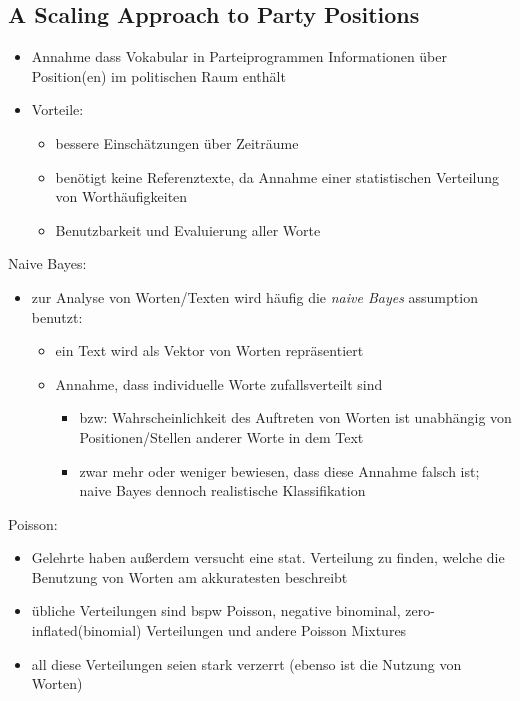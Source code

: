\documentclass[11pt]{article}
\begin{document}
\subsection{A Scaling Approach to Party Positions}
\label{sec:org459ee79}
\begin{itemize}
\item Annahme dass Vokabular in Parteiprogrammen Informationen über Position(en) im politischen Raum enthält
\item Vorteile:
\begin{itemize}
\item bessere Einschätzungen über Zeiträume
\item benötigt keine Referenztexte, da Annahme einer statistischen Verteilung von Worthäufigkeiten
\item Benutzbarkeit und Evaluierung aller Worte
\end{itemize}
\end{itemize}

Naive Bayes:
\begin{itemize}
\item zur Analyse von Worten/Texten wird häufig die \emph{naive Bayes} assumption benutzt:
\begin{itemize}
\item ein Text wird als Vektor von Worten repräsentiert
\item Annahme, dass individuelle Worte zufallsverteilt sind
\begin{itemize}
\item bzw: Wahrscheinlichkeit des Auftreten von Worten ist unabhängig von Positionen/Stellen anderer Worte in dem Text
\item zwar mehr oder weniger bewiesen, dass diese Annahme falsch ist; naive Bayes dennoch realistische Klassifikation
\end{itemize}
\end{itemize}
\end{itemize}

Poisson:
\begin{itemize}
\item Gelehrte haben außerdem versucht eine stat. Verteilung zu finden, welche die Benutzung von Worten am akkuratesten beschreibt
\item übliche Verteilungen sind bspw Poisson, negative binominal, zero-inflated(binomial) Verteilungen und andere Poisson Mixtures
\item all diese Verteilungen seien stark verzerrt (ebenso ist die Nutzung von Worten)
\end{itemize}
\end{document}
